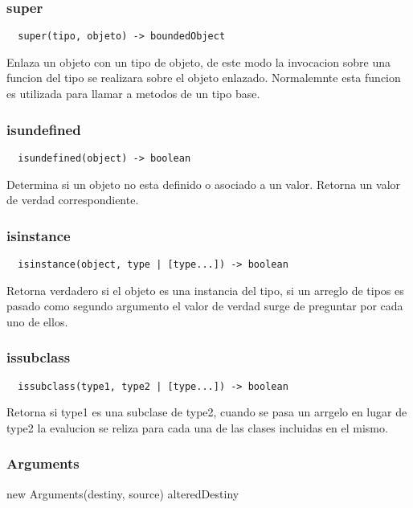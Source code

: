 \subsubsection*{super}
\begin{verbatim}
  super(tipo, objeto) -> boundedObject
\end{verbatim}
Enlaza un objeto con un tipo de objeto, de este modo la invocacion sobre una
funcion del tipo se realizara sobre el objeto enlazado.
Normalemnte esta funcion es utilizada para llamar a metodos de un tipo base.

\subsubsection*{isundefined}
\begin{verbatim}
  isundefined(object) -> boolean
\end{verbatim}
Determina si un objeto no esta definido o asociado a un valor. Retorna un valor
de verdad correspondiente.

\subsubsection*{isinstance}
\begin{verbatim}
  isinstance(object, type | [type...]) -> boolean
\end{verbatim}
Retorna verdadero si el objeto es una instancia del tipo, si un arreglo de tipos
es pasado como segundo argumento el valor de verdad surge de preguntar por cada
uno de ellos.

\subsubsection*{issubclass}
\begin{verbatim}
  issubclass(type1, type2 | [type...]) -> boolean
\end{verbatim}
Retorna si type1 es una subclase de type2, cuando se pasa un arrgelo en lugar de
type2 la evalucion se reliza para cada una de las clases incluidas en el mismo.

\subsubsection*{Arguments}
new Arguments(destiny, source) \rightarrow alteredDestiny

\begin{lstlisting}[style=consola]
\end{lstlisting}

